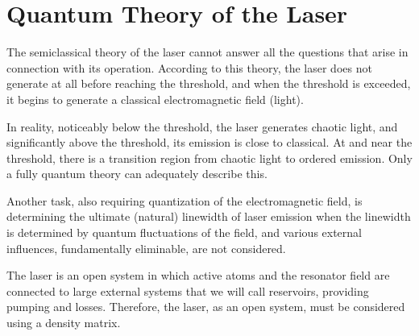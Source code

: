 \chapter{Quantum Theory of the Laser}
\label{chLaser}

The semiclassical theory of the laser cannot answer all the questions that arise in connection with its operation. According to this theory, the laser does not generate at all before reaching the threshold, and when the threshold is exceeded, it begins to generate a classical electromagnetic field (light).

In reality, noticeably below the threshold, the laser generates chaotic light, and significantly above the threshold, its emission is close to classical. At and near the threshold, there is a transition region from chaotic light to ordered emission. Only a fully quantum theory can adequately describe this.

Another task, also requiring quantization of the electromagnetic field, is determining the ultimate (natural) linewidth of laser emission when the linewidth is determined by quantum fluctuations of the field, and various external influences, fundamentally eliminable, are not considered.

The laser is an open system in which active atoms and the resonator field are connected to large external systems that we will call reservoirs, providing pumping and losses. Therefore, the laser, as an open system, must be considered using a density matrix.







